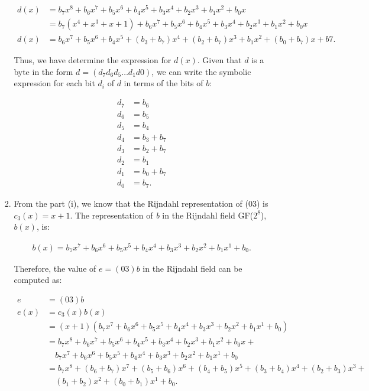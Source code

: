 \documentclass[11pt]{article}
\theoremstyle{definition}
\begin{document}
\begin{enumerate}
\begin{enumerate}
\begin{enumerate}
\begin{align*}
    d(x) &= b_7x^8 + b_6x^7 + b_5x^6 + b_4x^5 + b_3x^4 + b_2x^3 + b_1x^2 + b_0x \\
    &= b_7(x^4 + x^3 + x + 1) + b_6x^7 + b_5x^6 + b_4x^5 + b_3x^4 + b_2x^3 + b_1x^2 + b_0x \\
    d(x) &= b_6x^7 + b_5x^6 + b_4x^5 + (b_3 + b_7)x^4 + (b_2 + b_7)x^3 + b_1x^2 + (b_0 + b_7)x + b7.
\end{align*}

Thus, we have determine the expression for $d(x)$. Given that $d$ is a byte in the form $d = (d_7d_6d_5 \ldots d_1d0)$, we can write the symbolic expression for each bit $d_i$ of $d$ in terms of the bits of $b$:

\begin{align*}
    d_7 &= b_6 \\
    d_6 &= b_5 \\
    d_5 &= b_4 \\
    d_4 &= b_3 + b_7 \\
    d_3 &= b_2 + b_7 \\
    d_2 &= b_1 \\
    d_1 &= b_0 + b_7 \\
    d_0 &= b_7.
\end{align*}

\item From the part (i), we know that the Rijndahl representation of (03) is $c_3(x) = x + 1$. The representation of \textit{b} in the Rijndahl field GF($2^8$), $b(x)$, is:

\begin{align*}
    b(x) = b_7x^7 + b_6x^6 + b_5x^5 + b_4x^4 + b_3x^3 + b_2x^2 + b_1x^1 + b_0.
\end{align*}

Therefore, the value of $e = (03)b$ in the Rijndahl field can be computed as:

\begin{align*}
    e &= (03)b \\
    e(x) &= c_3(x)b(x) \\
    &= (x + 1)(b_7x^7 + b_6x^6 + b_5x^5 + b_4x^4 + b_3x^3 + b_2x^2 + b_1x^1 + b_0) \\
    &= b_7x^8 + b_6x^7 + b_5x^6 + b_4x^5 + b_3x^4 + b_2x^3 + b_1x^2 + b_0x +\\
    & \quad b_7x^7 + b_6x^6 + b_5x^5 + b_4x^4 + b_3x^3 + b_2x^2 + b_1x^1 + b_0 \\
    &= b_7x^8 + (b_6 + b_7)x^7 + (b_5 + b_6)x^6 + (b_4 + b_5)x^5 + (b_3 + b_4)x^4 + (b_2 + b_3)x^3 +\\
    & \quad (b_1 + b_2)x^2 + (b_0 + b_1)x^1 + b_0.
\end{align*}


\end{enumerate}
\end{enumerate}
\end{enumerate}
\end{document}
